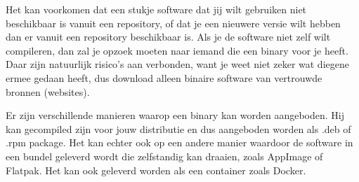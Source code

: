 Het kan voorkomen dat een stukje software dat jij wilt gebruiken niet beschikbaar is vanuit een repository, of dat je een nieuwere versie wilt hebben dan er vanuit een repository beschikbaar is. Als je de software niet zelf wilt compileren, dan zal je opzoek moeten naar iemand die een binary voor je heeft. Daar zijn natuurlijk risico's aan verbonden, want je weet niet zeker wat diegene ermee gedaan heeft, dus download alleen binaire software van vertrouwde bronnen (websites).

Er zijn verschillende manieren waarop een binary kan worden aangeboden. Hij kan gecompiled zijn voor jouw distributie en dus aangeboden worden als .deb of .rpm package. Het kan echter ook op een andere manier waardoor de software in een bundel geleverd wordt die zelfstandig kan draaien, zoals AppImage of Flatpak. Het kan ook geleverd worden als een container zoals Docker.
